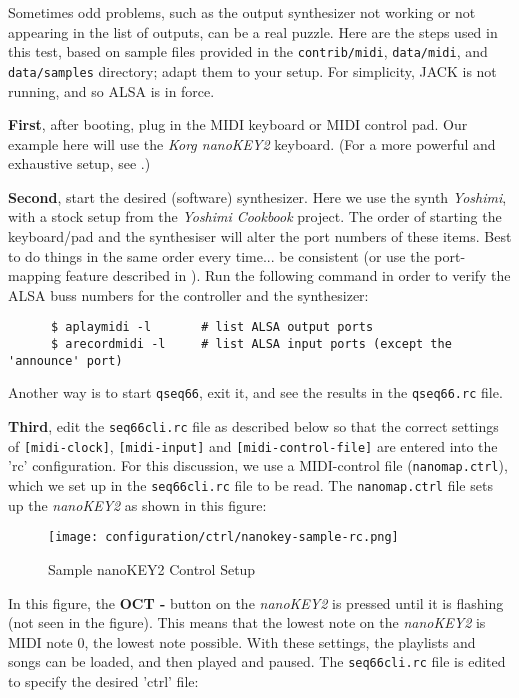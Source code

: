    Sometimes odd problems, such as the output synthesizer not working
   or not appearing in the list of outputs, can be a real puzzle.
   Here are the steps used in this test, based on sample files provided in the
   \texttt{contrib/midi}, \texttt{data/midi}, and \texttt{data/samples}
   directory; adapt them to your setup.  For
   simplicity, JACK is not running, and so ALSA is in force.

   \textbf{First}, after booting, plug in the MIDI keyboard or MIDI control
   pad.  Our example here will use the \textsl{Korg nanoKEY2} keyboard.  
   (For a more powerful and exhaustive setup, see
   .)

   \textbf{Second}, start the desired (software) synthesizer.
   Here we use the synth \textsl{Yoshimi}, with a stock setup from the
   \textsl{Yoshimi Cookbook} project.
   The order of starting the keyboard/pad and the synthesiser
   will alter the port numbers of these items.  Best to do things in the same
   order every time... be consistent (or use the port-mapping feature
   described in ).
   Run the following command in order to verify the ALSA buss numbers for
   the controller and the synthesizer:

   \begin{verbatim}
      $ aplaymidi -l       # list ALSA output ports
      $ arecordmidi -l     # list ALSA input ports (except the 'announce' port)
   \end{verbatim}

   Another way is to start \texttt{qseq66}, exit it,
   and see the results in the \texttt{qseq66.rc} file.

   \textbf{Third}, edit the \texttt{seq66cli.rc}
   file as described below so that the correct settings of
   \texttt{[midi-clock]}, \texttt{[midi-input]} and
   \texttt{[midi-control-file]} are entered into the 'rc' configuration.
   For this discussion, we use a MIDI-control file 
   (\texttt{nanomap.ctrl}), which we set up
   in the \texttt{seq66cli.rc} file to be read.
   The \texttt{nanomap.ctrl} file sets up the \textsl{nanoKEY2} as
   shown in this figure:

\begin{figure}[H]
   \centering 
   \texttt{[image: configuration/ctrl/nanokey-sample-rc.png]}
   \caption{Sample nanoKEY2 Control Setup}
   \label{fig:headless_nanokey2_setup}
\end{figure}

   In this figure, the \textbf{OCT -} button on the
   \textsl{nanoKEY2} is pressed until
   it is flashing (not seen in the figure).
   This means that the lowest note on the
   \textsl{nanoKEY2} is MIDI note 0, the lowest
   note possible.
   With these settings, the playlists and songs can be loaded,
   and then played and paused.
   The \texttt{seq66cli.rc} file is edited to specify the desired 'ctrl' file:

